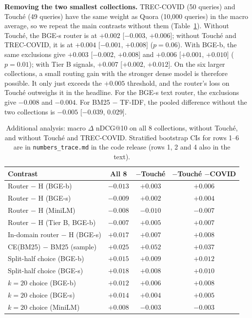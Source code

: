 \documentclass[conference]{IEEEtran}
\makeatletter
\newcommand{\Hy}{\textsc{H}}
\newcommand{\ndcg}{nDCG@10}
\makeatother
\begin{document}
\textbf{Removing the two smallest collections.} TREC-COVID (50 queries) and Touch\'e (49 queries) have the same weight as Quora (10,000 queries) in the macro average, so we repeat the main contrasts without them (Table~\ref{tab:sens}). Without Touch\'e, the BGE-s router is at $+0.002$ [$-0.003$, $+0.006$]; without Touch\'e and TREC-COVID, it is at $+0.004$ [$-0.001$, $+0.008$] ($p=0.06$). With BGE-b, the same exclusions give $+0.003$ [$-0.002$, $+0.008$] and $+0.006$ [$+0.001$, $+0.010$] ($p=0.01$); with Tier B signals, $+0.007$ [$+0.002$, $+0.012$]. On the six larger collections, a small routing gain with the stronger dense model is therefore possible. It only just exceeds the $+0.005$ threshold, and the router's loss on Touch\'e outweighs it in the headline. For the BGE-s text router, the exclusions give $-0.008$ and $-0.004$. For BM25 $-$ TF-IDF, the pooled difference without the two collections is $-0.005$ [$-0.039$, 0.029].

\begin{table}[t]
\centering
\caption{Additional analysis: macro $\Delta$ \ndcg{} on all 8 collections, without Touch\'e, and without Touch\'e and TREC-COVID. Stratified bootstrap CIs for rows 1--6 are in \texttt{numbers\_trace.md} in the code release (rows 1, 2 and 4 also in the text).}
\label{tab:sens}
\footnotesize
\setlength{\tabcolsep}{4pt}
\begin{tabular}{@{}lccc@{}}
\toprule
Contrast & All 8 & $-$Touch\'e & $-$Touch\'e $-$COVID \\
\midrule
Router $-$ \Hy{} (BGE-b) & $-0.013$ & $+0.003$ & $+0.006$ \\
Router $-$ \Hy{} (BGE-s) & $-0.009$ & $+0.002$ & $+0.004$ \\
Router $-$ \Hy{} (MiniLM) & $-0.008$ & $-0.010$ & $-0.007$ \\
Router $-$ \Hy{} (Tier B, BGE-b) & $-0.007$ & $+0.005$ & $+0.007$ \\
In-domain router $-$ \Hy{} (BGE-s) & $+0.017$ & $+0.007$ & $+0.008$ \\
CE(BM25) $-$ BM25 (sample) & $+0.025$ & $+0.052$ & $+0.037$ \\
Split-half choice (BGE-b) & $+0.015$ & $+0.009$ & $+0.012$ \\
Split-half choice (BGE-s) & $+0.018$ & $+0.008$ & $+0.010$ \\
$k{=}20$ choice (BGE-b) & $+0.012$ & $+0.006$ & $+0.008$ \\
$k{=}20$ choice (BGE-s) & $+0.014$ & $+0.004$ & $+0.005$ \\
$k{=}20$ choice (MiniLM) & $+0.008$ & $-0.003$ & $-0.003$ \\
\bottomrule
\end{tabular}
\end{table}
\end{document}
